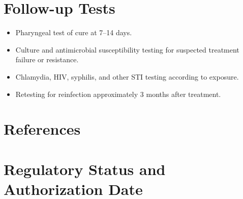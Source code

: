 \section*{Follow-up Tests}
\begin{itemize}
  \item Pharyngeal test of cure at 7--14 days.
  \item Culture and antimicrobial susceptibility testing for suspected treatment failure or resistance.
  \item Chlamydia, HIV, syphilis, and other STI testing according to exposure.
  \item Retesting for reinfection approximately 3 months after treatment.
\end{itemize}

\section*{References}


\clearpage
\section*{Regulatory Status and Authorization Date}

\clearpage
